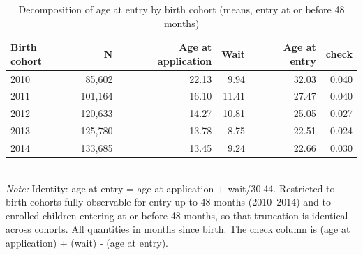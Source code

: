 \begin{table}[htbp]\centering
\caption{Decomposition of age at entry by birth cohort (means, entry at or before 48 months)}
\label{tab:S3a_decomp}
\small
\begin{tabular}{lrrrrr}
\toprule
Birth cohort & N & Age at application & Wait & Age at entry & check \\
\midrule
2010 & 85,602 & 22.13 & 9.94 & 32.03 & 0.040 \\
2011 & 101,164 & 16.10 & 11.41 & 27.47 & 0.040 \\
2012 & 120,633 & 14.27 & 10.81 & 25.05 & 0.027 \\
2013 & 125,780 & 13.78 & 8.75 & 22.51 & 0.024 \\
2014 & 133,685 & 13.45 & 9.24 & 22.66 & 0.030 \\
\bottomrule
\end{tabular}
\\[3pt]{\footnotesize \textit{Note:} Identity: age at entry = age at application + wait/30.44. Restricted to birth cohorts fully observable for entry up to 48 months (2010--2014) and to enrolled children entering at or before 48 months, so that truncation is identical across cohorts. All quantities in months since birth. The check column is (age at application) + (wait) - (age at entry).}
\end{table}
